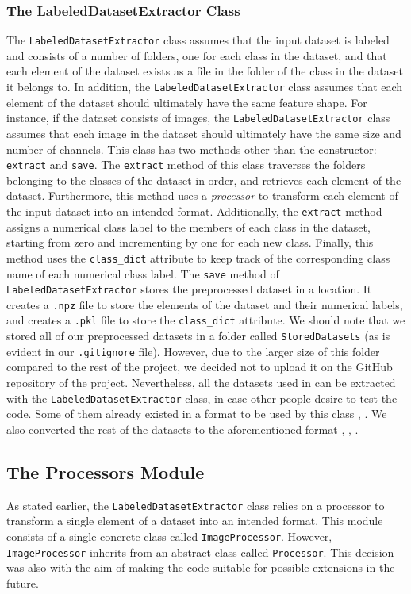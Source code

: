\documentclass[14pt]{extarticle}
\begin{document}
		\subsubsection{The LabeledDatasetExtractor Class}
		The \texttt{LabeledDatasetExtractor} class assumes that the input dataset is labeled and consists of a number of folders, one for each class in the dataset, and that each element of the dataset exists as a file in the folder of the class in the dataset it belongs to. In addition, the \texttt{LabeledDatasetExtractor} class assumes that each element of the dataset should ultimately have the same feature shape. For instance, if the dataset consists of images, the \texttt{LabeledDatasetExtractor} class assumes that each image in the dataset should ultimately have the same size and number of channels. This class has two methods other than the constructor: \texttt{extract} and \texttt{save}. The \texttt{extract} method of this class traverses the folders belonging to the classes of the dataset in order, and retrieves each element of the dataset. Furthermore, this method uses a \textit{processor} to transform each element of the input dataset into an intended format. Additionally, the \texttt{extract} method assigns a numerical class label to the members of each class in the dataset, starting from zero and incrementing by one for each new class. Finally, this method uses the \texttt{class\_dict} attribute to keep track of the corresponding class name of each numerical class label. The \texttt{save} method of \texttt{LabeledDatasetExtractor} stores the preprocessed dataset in a location. It creates a \texttt{.npz} file to store the elements of the dataset and their numerical labels, and creates a \texttt{.pkl} file to store the \texttt{class\_dict} attribute. We should note that we stored all of our preprocessed datasets in a folder called \texttt{StoredDatasets} (as is evident in our \texttt{.gitignore} file). However, due to the larger size of this folder compared to the rest of the project, we decided not to upload it on the GitHub repository of the project. Nevertheless, all the datasets used in \cite{adda} can be extracted with the \texttt{LabeledDatasetExtractor} class, in case other people desire to test the code. Some of them already existed in a format to be used by this class \cite{mnistjpg}, \cite{officepwc}. We also converted the rest of the datasets to the aforementioned format \cite{uspsjpg}, \cite{svhnjpg}, \cite{nyud2jpg}.
		\subsection{The Processors Module}
		As stated earlier, the \texttt{LabeledDatasetExtractor} class relies on a processor to transform a single element of a dataset into an intended format. This module consists of a single concrete class called \texttt{ImageProcessor}. However, \texttt{ImageProcessor} inherits from an abstract class called \texttt{Processor}. This decision was also with the aim of making the code suitable for possible extensions in the future.
\end{document}

